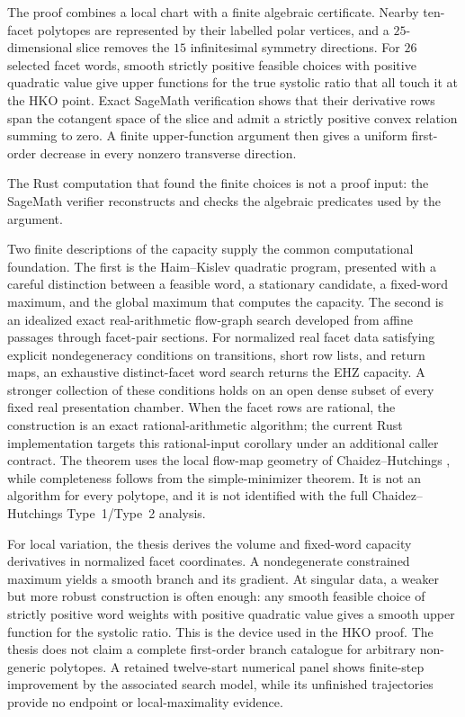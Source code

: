 The proof combines a local chart with a finite algebraic certificate.  Nearby
ten-facet polytopes are represented by their labelled polar vertices, and a
$25$-dimensional slice removes the $15$ infinitesimal symmetry directions.
For $26$ selected facet words, smooth strictly positive feasible choices with
positive quadratic value give upper functions for the true systolic ratio that
all touch it at the HKO point.  Exact SageMath verification shows that their
derivative rows span the cotangent space of the slice and admit a strictly
positive convex relation summing to zero.  A finite upper-function argument
then gives a uniform first-order decrease in every nonzero transverse
\mbox{direction}.

The Rust computation that found the finite choices is not a proof input: the
SageMath verifier reconstructs and checks the algebraic predicates used by the
argument.

Two finite descriptions of the capacity supply the common computational
foundation.  The first is the Haim--Kislev quadratic program, presented with a
careful distinction between a feasible word, a stationary candidate, a
fixed-word maximum, and the global maximum that computes the capacity.  The
second is an idealized exact real-arithmetic flow-graph search developed from
affine passages through facet-pair sections.  For normalized real facet data
satisfying explicit nondegeneracy conditions on transitions, short row lists,
and return maps, an exhaustive distinct-facet word search returns the EHZ
capacity.  A stronger collection of these conditions holds on an open dense
subset of every fixed real presentation chamber.  When the facet rows are
rational, the construction is an exact rational-arithmetic algorithm; the
current Rust implementation targets this rational-input corollary under an
additional caller contract.  The theorem uses the local flow-map geometry of
Chaidez--Hutchings \cite{CH2021}, while completeness follows from the
simple-minimizer theorem.  It is not an algorithm for every polytope, and it is
not identified with the full Chaidez--Hutchings Type~1/Type~2 analysis.

For local variation, the thesis derives the volume and fixed-word capacity
derivatives in normalized facet coordinates.  A nondegenerate constrained
maximum yields a smooth branch and its gradient.  At singular data, a weaker
but more robust construction is often enough: any smooth feasible choice of
strictly positive word weights with positive quadratic value gives a smooth
upper function for the systolic ratio.  This is the device used in the HKO
proof.  The thesis does not claim a complete first-order branch catalogue for
arbitrary non-generic polytopes.  A retained twelve-start numerical panel shows
finite-step improvement by the associated search model, while its unfinished
trajectories provide no endpoint or local-maximality evidence.

